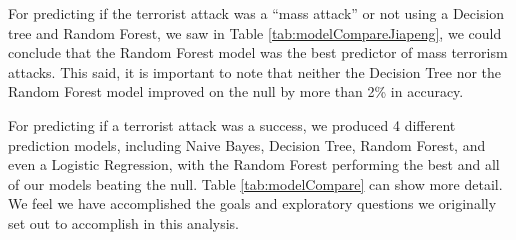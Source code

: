 \documentclass[11pt,letterpaper,]{article}
\theoremstyle{definition}
\theoremstyle{definition}
\theoremstyle{definition}
\theoremstyle{remark}
\begin{document}
For predicting if the terrorist attack was a ``mass attack'' or not
using a Decision tree and Random Forest, we saw in Table
\ref{tab:modelCompareJiapeng}, we could conclude that the Random Forest
model was the best predictor of mass terrorism attacks. This said, it is
important to note that neither the Decision Tree nor the Random Forest
model improved on the null by more than 2\% in accuracy.

For predicting if a terrorist attack was a success, we produced 4
different prediction models, including Naive Bayes, Decision Tree,
Random Forest, and even a Logistic Regression, with the Random Forest
performing the best and all of our models beating the null. Table
\ref{tab:modelCompare} can show more detail. We feel we have
accomplished the goals and exploratory questions we originally set out
to accomplish in this analysis.
\end{document}
